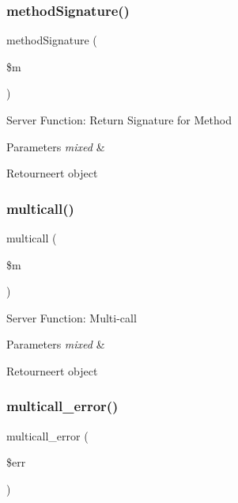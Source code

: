 \subsubsection{\texorpdfstring{methodSignature()}{methodSignature()}}
{\footnotesize\ttfamily method\+Signature (\begin{DoxyParamCaption}\item[{}]{\$m }\end{DoxyParamCaption})}

Server Function\+: Return Signature for Method


\begin{DoxyParams}{Parameters}
{\em mixed} & \\
\hline
\end{DoxyParams}
\begin{DoxyReturn}{Retourneert}
object 
\end{DoxyReturn}
\mbox{\label{class_c_i___xmlrpcs_a122ce829a1aa3f0041f922ec5feb95c8}} 
\subsubsection{\texorpdfstring{multicall()}{multicall()}}
{\footnotesize\ttfamily multicall (\begin{DoxyParamCaption}\item[{}]{\$m }\end{DoxyParamCaption})}

Server Function\+: Multi-\/call


\begin{DoxyParams}{Parameters}
{\em mixed} & \\
\hline
\end{DoxyParams}
\begin{DoxyReturn}{Retourneert}
object 
\end{DoxyReturn}
\mbox{\label{class_c_i___xmlrpcs_a4cf545e6c15e1487b223346b18ca017d}} 
\subsubsection{\texorpdfstring{multicall\_error()}{multicall\_error()}}
{\footnotesize\ttfamily multicall\+\_\+error (\begin{DoxyParamCaption}\item[{}]{\$err }\end{DoxyParamCaption})}

